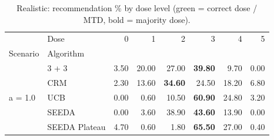 \begin{table}[H]
\centering
\caption{Realistic: recommendation \% by dose level (green = correct dose / MTD, bold = majority dose).}
\label{tab:real_rec_by_dose}
\begin{tabular}{llrrrrrr}
\toprule
 & Dose & 0 & 1 & 2 & 3 & 4 & 5 \\
Scenario & Algorithm &  &  &  &  &  &  \\
\midrule
\multirow[c]{5}{*}{a = 1.0} & 3 + 3 & 3.50 & 20.00 & {\cellcolor[HTML]{C8E6C9}} 27.00 & \bfseries 39.80 & 9.70 & 0.00 \\
 & CRM & 2.30 & 13.60 & {\cellcolor[HTML]{C8E6C9}} \bfseries 34.60 & 24.50 & 18.20 & 6.80 \\
 & UCB & 0.00 & 0.60 & {\cellcolor[HTML]{C8E6C9}} 10.50 & \bfseries 60.90 & 24.80 & 3.20 \\
 & SEEDA & 0.00 & 3.60 & {\cellcolor[HTML]{C8E6C9}} 38.90 & \bfseries 43.60 & 13.90 & 0.00 \\
 & SEEDA Plateau & 4.70 & 0.60 & {\cellcolor[HTML]{C8E6C9}} 1.80 & \bfseries 65.50 & 27.00 & 0.40 \\
\bottomrule
\end{tabular}
\end{table}
